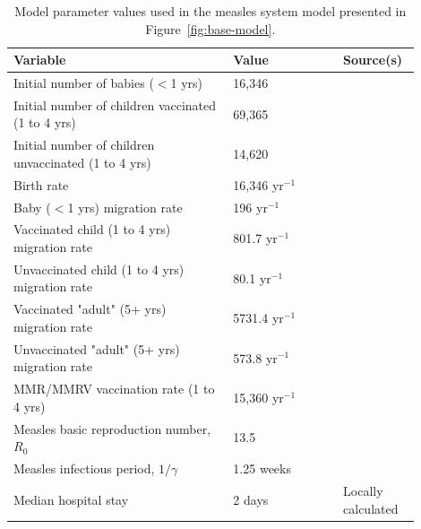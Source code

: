 \documentclass[12pt]{article}
\begin{document}
\begin{table}[ht!]
    \begin{tabular}{p{0.5\linewidth} | p{0.25\linewidth} | p{0.15\linewidth}}
    \toprule
    \textbf{Variable} & \textbf{Value} & \textbf{Source(s)}\\ \midrule
    
    Initial number of babies ($<$1 yrs) & 16,346 & \cite{ONS2021census} \\
    
    Initial number of children vaccinated (1 to 4 yrs) & 69,365&  \cite{ONS2021census, NHSEngland2026FDP}  \\
    
    Initial number of children unvaccinated (1 to 4 yrs) & 14,620 & \cite{ONS2021census, NHSEngland2026FDP} \\
    
    Birth rate & 16,346 yr$^{-1}$ & \cite{ONS2021census} \\
    
    Baby ($<$1 yrs) migration rate & 196 yr$^{-1}$ & \cite{ONS2021census} \\
    
    Vaccinated child (1 to 4 yrs) migration rate & 801.7 yr$^{-1}$ & \cite{ONS2021census, WHO_measles_coverage} \\
    
    Unvaccinated child (1 to 4 yrs) migration rate & 80.1 yr$^{-1}$ & \cite{ONS2021census, WHO_measles_coverage} \\

    Vaccinated "adult" (5+ yrs) migration rate & 5731.4 yr$^{-1}$ & \cite{ONS2021census, WHO_measles_coverage} \\
    
    Unvaccinated "adult" (5+ yrs) migration rate & 573.8 yr$^{-1}$ & \cite{ONS2021census, WHO_measles_coverage} \\

    MMR/MMRV vaccination rate (1 to 4 yrs) & 15,360 yr$^{-1}$ & \cite{NHSEngland2026FDP} \\

    Measles basic reproduction number, $R_0$ & 13.5 & \cite{https://doi.org/10.1111/risa.12637} \\

    Measles infectious period, $1/\gamma$ & 1.25 weeks & \cite{WHO2025MeaslesFactsheet} \\



    Median hospital stay & 2 days & Locally calculated \cite{BSolICBWarehouse2026} \\

    
    \bottomrule
    \end{tabular}
    \caption{Model parameter values used in the measles system model presented in Figure~\ref{fig:base-model}.}
    \label{tab:model-params} 
\end{table}
\end{document}
